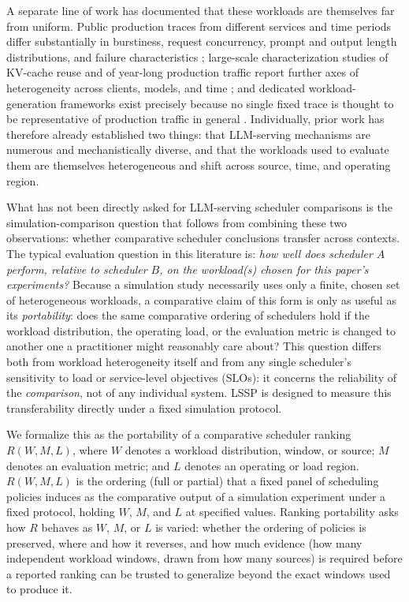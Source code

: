 A separate line of work has documented that these workloads are themselves
far from uniform. Public production traces from different services and time
periods differ substantially in burstiness, request concurrency, prompt and
output length distributions, and failure characteristics
\citep{burstgpt2025,patel2024splitwise,stojkovic2025dynamollm}; large-scale
characterization studies of KV-cache reuse and of year-long production
traffic report further axes of heterogeneity across clients, models, and
time \citep{kvcache_wild2025,ayearinllmserving2026}; and dedicated
workload-generation frameworks exist precisely because no single fixed trace
is thought to be representative of production traffic in general
\citep{servegen2026}. Individually, prior work has therefore already
established two things: that LLM-serving mechanisms are numerous and
mechanistically diverse, and that the workloads used to evaluate them are
themselves heterogeneous and shift across source, time, and operating
region.

What has not been directly asked for LLM-serving scheduler comparisons is
the simulation-comparison question that follows from combining these two
observations: whether comparative scheduler conclusions transfer across
contexts. The typical evaluation question in this literature is: \emph{how
well does scheduler $A$ perform, relative to scheduler $B$, on the
workload(s) chosen for this paper's experiments?} Because a simulation study
necessarily uses only a finite, chosen set of heterogeneous workloads, a
comparative claim of this form is only as useful as its
\emph{portability}: does the same comparative ordering of schedulers hold if
the workload distribution, the operating load, or the evaluation metric is
changed to another one a practitioner might reasonably care about? This
question differs both from workload heterogeneity itself and from any single
scheduler's sensitivity to load or service-level objectives (SLOs): it
concerns the reliability of the \emph{comparison}, not of any individual
system. LSSP is designed to measure this transferability directly under a
fixed simulation protocol.

We formalize this as the portability of a comparative scheduler ranking
$R(W, M, L)$, where $W$ denotes a workload distribution, window, or source;
$M$ denotes an evaluation metric; and $L$ denotes an operating or load
region. $R(W, M, L)$ is the ordering (full or partial) that a fixed panel of
scheduling policies induces as the comparative output of a simulation
experiment under a fixed protocol, holding $W$, $M$, and $L$ at specified
values. Ranking portability asks how $R$ behaves as $W$, $M$, or $L$ is
varied: whether the ordering of policies is preserved, where and how it
reverses, and how much evidence (how many independent workload windows,
drawn from how many sources) is required before a reported ranking can be
trusted to generalize beyond the exact windows used to produce it.

